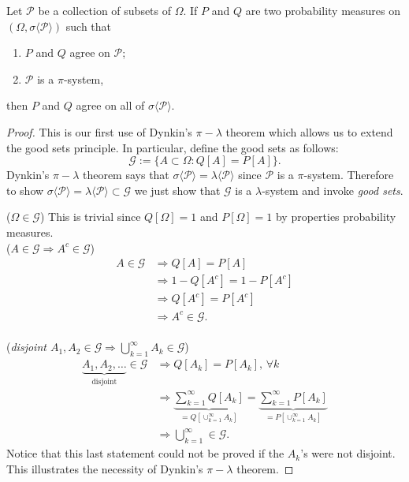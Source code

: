 \begin{theorem}
\label{ui}
Let $\mathcal P$ be a collection of subsets of $\Omega$.
If $P$ and $Q$ are two probability measures on $(\Omega, \sigma\langle \mathcal P\rangle)$ such that
\begin{enumerate}
\item $P$ and $Q$ agree on $\mathcal P$;
\item $\mathcal P$ is a $\pi$-system,
\end{enumerate}
then $P$ and $Q$ agree on all of $ \sigma\langle \mathcal P\rangle$.
\end{theorem}
\begin{proof}
This is our first use of Dynkin's $\pi-\lambda$ theorem which allows us to extend the good sets principle. In particular, define the good sets as follows:
\begin{equation}
\mathcal G:=\{A\subset \Omega\colon Q[A] = P[A] \}.
\end{equation}
Dynkin's $\pi-\lambda$ theorem says that $\sigma\langle \mathcal P\rangle = \lambda\langle \mathcal P\rangle$ since $\mathcal P$ is a $\pi$-system. Therefore to show $\sigma\langle \mathcal P\rangle = \lambda\langle \mathcal P\rangle\subset \mathcal G$ we just show that $\mathcal G$ is a $\lambda$-system and invoke {\it good sets}.

\textbullet({\sl $\Omega \in \mathcal G$}) This is trivial since $Q[\Omega]=1$ and $P[\Omega]=1$  by properties probability measures.
\\
\textbullet({\sl $A\in \mathcal  G\Longrightarrow A^c\in \mathcal G$})
\begin{align*}
A\in \mathcal G
&\Longrightarrow Q[A] = P[A]  \\
&\Longrightarrow 1-Q[A^c] = 1-P[A^c] \\
&\Longrightarrow Q[A^c] = P[A^c] \\
&\Longrightarrow A^c\in \mathcal G.
\end{align*}
\\
\textbullet({\sl disjoint $A_1, A_2\in \mathcal  G\Longrightarrow \bigcup_{k=1}^\infty A_k\in \mathcal G$})
\begin{align*}
\underbrace{A_1,A_2,\ldots}_{\text{disjoint}}\in \mathcal G
&\Longrightarrow  Q[A_k] = P[A_k],\,\forall k  \\
&\Longrightarrow \underbrace{\sum_{k=1}^\infty Q[A_k]}_{=Q[\cup_{k=1}^\infty A_k]} = \underbrace{\sum_{k=1}^\infty P[A_k]}_{=P[\cup_{k=1}^\infty A_k]}  \\
&\Longrightarrow \bigcup_{k=1}^\infty \in \mathcal G.
\end{align*}
Notice that this last statement could not be proved if the $A_k$'s were not disjoint. This illustrates the necessity of Dynkin's $\pi-\lambda$ theorem.

\end{proof}


